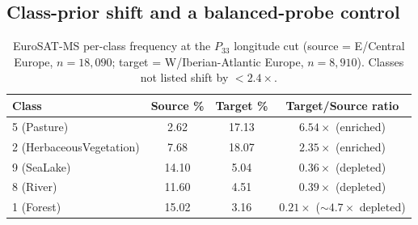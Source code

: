 \documentclass[journal]{IEEEtran}
\renewcommand{\_}{\textunderscore\allowbreak}
\begin{document}
\subsection{Class-prior shift and a balanced-probe control}

\begin{table}[!t]\centering\small
\caption{EuroSAT-MS per-class frequency at the $P_{33}$ longitude cut (source = E/Central Europe,
$n{=}18{,}090$; target = W/Iberian-Atlantic Europe, $n{=}8{,}910$). Classes not listed shift by
${<}2.4\times$.}\label{tab:classprior}
\begin{tabular}{lccc}
\toprule
Class & Source \% & Target \% & Target/Source ratio \\
\midrule
5 (Pasture) & 2.62 & 17.13 & $6.54\times$ (enriched) \\
2 (HerbaceousVegetation) & 7.68 & 18.07 & $2.35\times$ (enriched) \\
9 (SeaLake) & 14.10 & 5.04 & $0.36\times$ (depleted) \\
8 (River) & 11.60 & 4.51 & $0.39\times$ (depleted) \\
1 (Forest) & 15.02 & 3.16 & $0.21\times$ ($\sim\!4.7\times$ depleted) \\
\bottomrule
\end{tabular}
\end{table}
\end{document}
